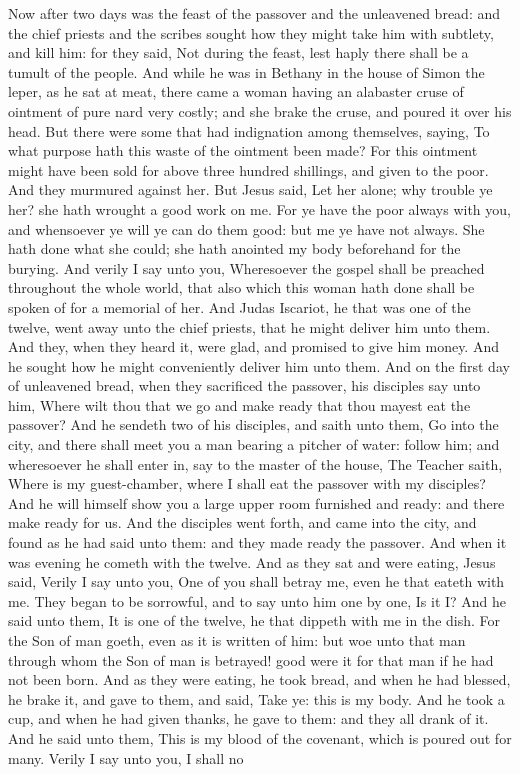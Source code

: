 Now after two days was the feast of the passover and the unleavened bread: and the chief priests and the scribes sought how they might take him with subtlety, and kill him: for they said, Not during the feast, lest haply there shall be a tumult of the people.  And while he was in Bethany in the house of Simon the leper, as he sat at meat, there came a woman having an alabaster cruse of ointment of pure nard very costly; and she brake the cruse, and poured it over his head. But there were some that had indignation among themselves, saying, To what purpose hath this waste of the ointment been made? For this ointment might have been sold for above three hundred shillings, and given to the poor. And they murmured against her. But Jesus said, Let her alone; why trouble ye her? she hath wrought a good work on me. For ye have the poor always with you, and whensoever ye will ye can do them good: but me ye have not always. She hath done what she could; she hath anointed my body beforehand for the burying. And verily I say unto you, Wheresoever the gospel shall be preached throughout the whole world, that also which this woman hath done shall be spoken of for a memorial of her.  And Judas Iscariot, he that was one of the twelve, went away unto the chief priests, that he might deliver him unto them. And they, when they heard it, were glad, and promised to give him money. And he sought how he might conveniently deliver him unto them.  And on the first day of unleavened bread, when they sacrificed the passover, his disciples say unto him, Where wilt thou that we go and make ready that thou mayest eat the passover? And he sendeth two of his disciples, and saith unto them, Go into the city, and there shall meet you a man bearing a pitcher of water: follow him; and wheresoever he shall enter in, say to the master of the house, The Teacher saith, Where is my guest-chamber, where I shall eat the passover with my disciples? And he will himself show you a large upper room furnished and ready: and there make ready for us. And the disciples went forth, and came into the city, and found as he had said unto them: and they made ready the passover.  And when it was evening he cometh with the twelve. And as they sat and were eating, Jesus said, Verily I say unto you, One of you shall betray me, even he that eateth with me. They began to be sorrowful, and to say unto him one by one, Is it I? And he said unto them, It is one of the twelve, he that dippeth with me in the dish. For the Son of man goeth, even as it is written of him: but woe unto that man through whom the Son of man is betrayed! good were it for that man if he had not been born.  And as they were eating, he took bread, and when he had blessed, he brake it, and gave to them, and said, Take ye: this is my body. And he took a cup, and when he had given thanks, he gave to them: and they all drank of it. And he said unto them, This is my blood of the covenant, which is poured out for many. Verily I say unto you, I shall no 